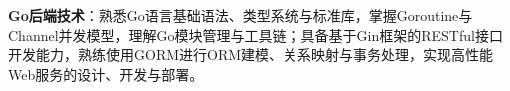 \item \textbf{Go后端技术}：熟悉Go语言基础语法、类型系统与标准库，掌握Goroutine与Channel并发模型，理解Go模块管理与工具链；具备基于Gin框架的RESTful接口开发能力，熟练使用GORM进行ORM建模、关系映射与事务处理，实现高性能Web服务的设计、开发与部署。